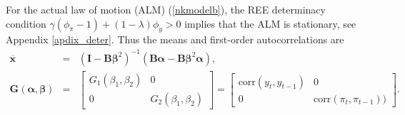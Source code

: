 For the actual law of motion (ALM) (\ref{nkmodelb}), the REE determinacy condition $\gamma(\phi_{\pi}-1)+(1-\lambda)\phi_y>0$ implies that the ALM is stationary, see Appendix \ref{apdix_deter}. Thus the means and first-order autocorrelations are
\begin{eqnarray*}\label{nkcondition}
{\pmb {\overline x}} &=& (\pmb I-{\pmb B}{\pmb\beta}^2)^{-1}({\pmb B\pmb\alpha}-{\pmb B\pmb\beta}^2{\pmb\alpha}),\\
{\pmb G}({\pmb\alpha},{\pmb\beta})&=&\left[\begin{array}{cc}
G_{1}(\beta_1,\beta_2)&0\\
0&G_{2}(\beta_1,\beta_2)
\end{array}\right]=\left[\begin{array}{cc}
\mbox{corr}(y_t, y_{t-1})&0\\
0&\mbox{corr}(\pi_t,
\pi_{t-1}))
\end{array}\right].
\end{eqnarray*}


